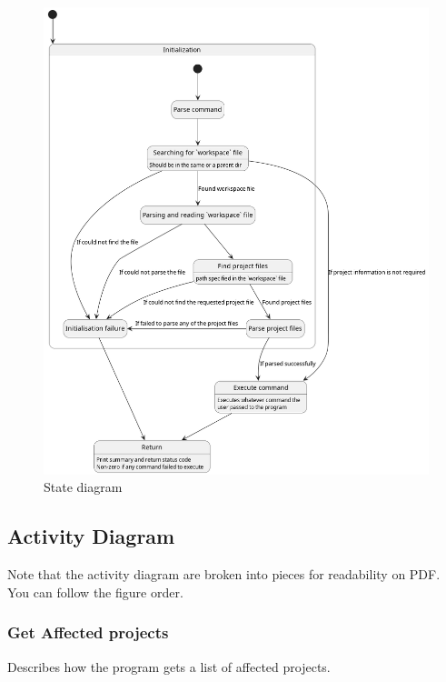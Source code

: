 \documentclass[11pt]{article}
\begin{document}
\begin{figure}[htbp]
  \centering
  \includegraphics[width=0.5\textheight]{diags/state.png}
  \caption{\label{fig:state}State diagram}
\end{figure}

\newpage
\subsection{Activity Diagram}

Note that the activity diagram are broken into pieces for readability on PDF.
You can follow the figure order.

\subsubsection{Get Affected projects}

Describes how the program gets a list of affected projects.
\end{document}

